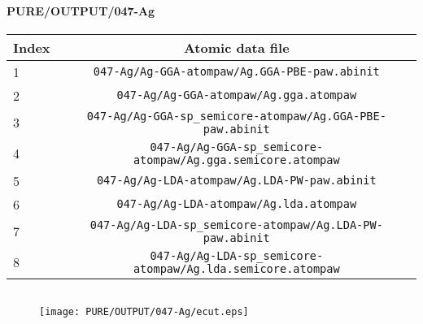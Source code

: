 \documentclass[onecolumn]{revtex4}
\begin{document}
\paragraph*{\bf{PURE/OUTPUT/047-Ag}}
\begin{center}
\begin{tabular}{lc}
\hline
Index & Atomic data file \\
\hline
1 & \verb?047-Ag/Ag-GGA-atompaw/Ag.GGA-PBE-paw.abinit?\\
2 & \verb?047-Ag/Ag-GGA-atompaw/Ag.gga.atompaw?\\
3 & \verb?047-Ag/Ag-GGA-sp_semicore-atompaw/Ag.GGA-PBE-paw.abinit?\\
4 & \verb?047-Ag/Ag-GGA-sp_semicore-atompaw/Ag.gga.semicore.atompaw?\\
5 & \verb?047-Ag/Ag-LDA-atompaw/Ag.LDA-PW-paw.abinit?\\
6 & \verb?047-Ag/Ag-LDA-atompaw/Ag.lda.atompaw?\\
7 & \verb?047-Ag/Ag-LDA-sp_semicore-atompaw/Ag.LDA-PW-paw.abinit?\\
8 & \verb?047-Ag/Ag-LDA-sp_semicore-atompaw/Ag.lda.semicore.atompaw?\\
\hline
\end{tabular}
\end{center}
\begin{center}
\begin{tabular}{lccccc}
\hline
\hline
\end{tabular}
\end{center}
\begin{figure}[h] 
\centering 
\texttt{[image: PURE/OUTPUT/047-Ag/ecut.eps]}
\end{figure}
\newpage
\end{document}
